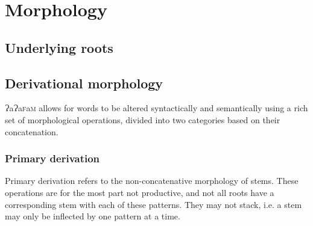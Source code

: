 \documentclass[a4paper,10pt,twoside,openright]{memoir}
\newcommand{\lang}{ɁaɁa\textsc{f}a\textsc{m}}
\begin{document}
\chapter{Morphology}
\section{Underlying roots}
\section{Derivational morphology}

\lang{} allows for words to be altered syntactically and semantically using a rich set of morphological operations, divided into two categories based on their concatenation. 

\subsection{Primary derivation}

Primary derivation refers to the non-concatenative morphology of stems. These operations are for the most part not productive, and not all roots have a corresponding stem with each of these patterns. They may not stack, i.e. a stem may only be inflected by one pattern at a time.
\end{document}
